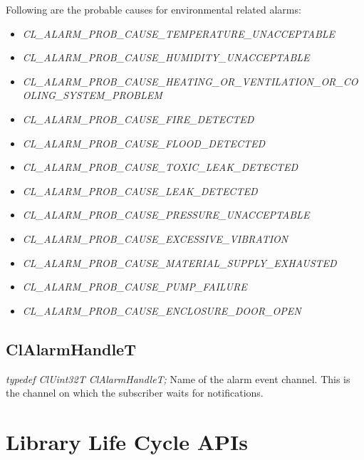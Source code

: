 \begin{flushleft}
\par
Following are the probable causes for environmental related alarms:
\begin{itemize}
\item \textit{CL\_\-ALARM\_\-PROB\_\-CAUSE\_\-TEMPERATURE\_\-UNACCEPTABLE}
\item \textit{CL\_\-ALARM\_\-PROB\_\-CAUSE\_\-HUMIDITY\_\-UNACCEPTABLE}
\item \textit{CL\_\-ALARM\_\-PROB\_\-CAUSE\_\-HEATING\_\-OR\_\-VENTILATION\_\-OR\_\-COOLING\_\-SYSTEM\_\-PROBLEM}
\item \textit{CL\_\-ALARM\_\-PROB\_\-CAUSE\_\-FIRE\_\-DETECTED}
\item \textit{CL\_\-ALARM\_\-PROB\_\-CAUSE\_\-FLOOD\_\-DETECTED}
\item \textit{CL\_\-ALARM\_\-PROB\_\-CAUSE\_\-TOXIC\_\-LEAK\_\-DETECTED}
\item \textit{CL\_\-ALARM\_\-PROB\_\-CAUSE\_\-LEAK\_\-DETECTED}
\item \textit{CL\_\-ALARM\_\-PROB\_\-CAUSE\_\-PRESSURE\_\-UNACCEPTABLE}
\item \textit{CL\_\-ALARM\_\-PROB\_\-CAUSE\_\-EXCESSIVE\_\-VIBRATION}
\item \textit{CL\_\-ALARM\_\-PROB\_\-CAUSE\_\-MATERIAL\_\-SUPPLY\_\-EXHAUSTED}
\item \textit{CL\_\-ALARM\_\-PROB\_\-CAUSE\_\-PUMP\_\-FAILURE}
\item \textit{CL\_\-ALARM\_\-PROB\_\-CAUSE\_\-ENCLOSURE\_\-DOOR\_\-OPEN}
\end{itemize}



\subsection{ClAlarmHandleT}

\textit{typedef ClUint32T ClAlarmHandleT;}
\newline
\newline
Name of the alarm event channel. This is the channel on which the subscriber waits for notifications. 








\newpage 

\section{Library Life Cycle APIs}

\end{flushleft}
